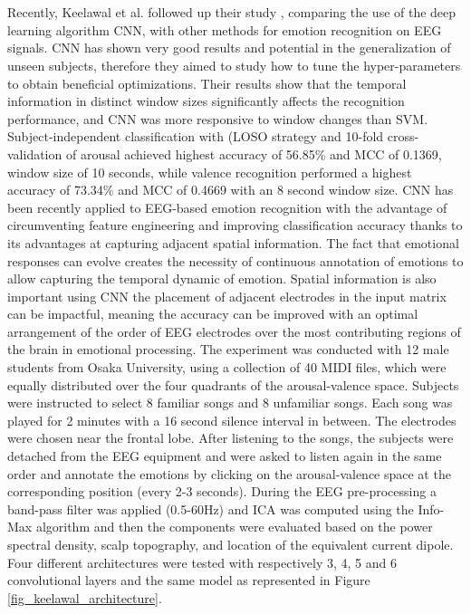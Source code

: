 \\
\\
Recently, Keelawal et al.\cite{keelawat_comparative_2021} followed up their study \cite{thammasan_continuous_2016}, comparing the use of the deep learning algorithm \ac{CNN}, with other methods for emotion recognition on \ac{EEG} signals. \ac{CNN} has shown very good results and potential in the generalization of unseen subjects, therefore they aimed to study how to tune the hyper-parameters to obtain beneficial optimizations. Their results show that the temporal information in distinct window sizes significantly affects the recognition performance, and \ac{CNN} was more responsive to window changes than \ac{SVM}. Subject-independent classification with (\ac{LOSO} strategy and 10-fold cross-validation of arousal achieved highest accuracy of 56.85\% and \ac{MCC} of 0.1369, window size of 10 seconds, while valence recognition performed a highest accuracy of 73.34\% and \ac{MCC} of 0.4669 with an 8 second window size. \ac{CNN} has been recently applied to EEG-based emotion recognition with the advantage of circumventing feature engineering and improving classification accuracy thanks to its advantages at capturing adjacent spatial information. The fact that emotional responses can evolve creates the necessity of continuous annotation of emotions to allow capturing the temporal dynamic of emotion. Spatial information is also important using \ac{CNN} the placement of adjacent electrodes in the input matrix can be impactful, meaning the accuracy can be improved with an optimal arrangement of the order of \ac{EEG} electrodes over the most contributing regions of the brain in emotional processing.
The experiment was conducted with 12 male students from Osaka University, using a collection of 40 MIDI files, which were equally distributed over the four quadrants of the arousal-valence space. Subjects were instructed to select 8 familiar songs and 8 unfamiliar songs. Each song was played for 2 minutes with a 16 second silence interval in between. The electrodes were chosen near the frontal lobe. After listening to the songs, the subjects were detached from the \ac{EEG} equipment and were asked to listen again in the same order and annotate the emotions by clicking on the arousal-valence space at the corresponding position (every 2-3 seconds). During the \ac{EEG} pre-processing a band-pass filter was applied (0.5-60Hz) and \ac{ICA} was computed using the Info-Max algorithm and then the components were evaluated based on the power spectral density, scalp topography, and location of the equivalent current dipole.
Four different architectures were tested with respectively 3, 4, 5 and 6 convolutional layers and the same model as represented in Figure \ref{fig_keelawal_architecture}. 

